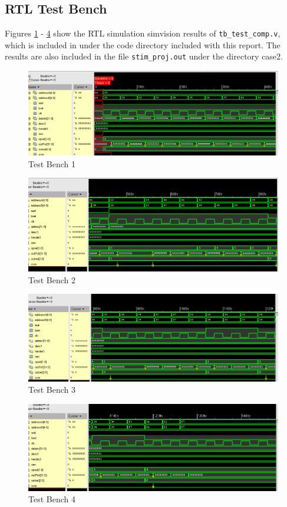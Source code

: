 \documentclass[12pt]{article}
\begin{document}
\subsection{RTL Test Bench}
Figures \ref{fig:rtl-results1} - \ref{fig:rtl-results4} show the RTL simulation simvision results of \texttt{tb\_test\_comp.v}, which is included in under the code directory included with this report. The results are also included in the file \texttt{stim\_proj.out} under the directory case2.
\begin{figure}[H]
\centering
\includegraphics[width=\linewidth]{../case2/rtl-results1}
\caption{Test Bench 1}
\label{fig:rtl-results1}
\end{figure}
\begin{figure}[H]
\centering
\includegraphics[width=\linewidth]{../case2/rtl-results2}
\caption{Test Bench 2}
\label{fig:rtl-results2}
\end{figure}
\begin{figure}[H]
\centering
\includegraphics[width=\linewidth]{../case2/rtl-results3}
\caption{Test Bench 3}
\label{fig:rtl-results3}
\end{figure}
\begin{figure}[H]
\centering
\includegraphics[width=\linewidth]{../case2/rtl-results4}
\caption{Test Bench 4}
\label{fig:rtl-results4}
\end{figure}
\end{document}
